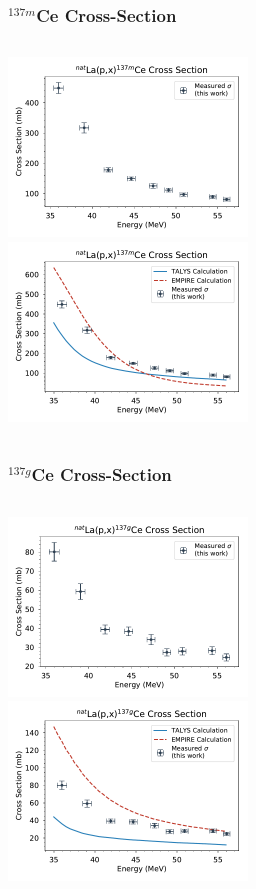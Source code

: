 \documentclass[12pt,xcolor=dvipsnames]{beamer}
\begin{document}
\begin{frame}
\frametitle{$^{137m}$Ce Cross-Section}
\begin{columns}[c]
\column{2.5in}
\includegraphics[width=2.5in]{cross_sections/137CEm_only}
\\
\column{2.5in}
\includegraphics[width=2.5in]{cross_sections/137CEm}
\\
\end{columns}
\end{frame}

\begin{frame}
\frametitle{$^{137g}$Ce Cross-Section}
\begin{columns}[c]
\column{2.5in}
\includegraphics[width=2.5in]{cross_sections/137CEg_only}
\\
\column{2.5in}
\includegraphics[width=2.5in]{cross_sections/137CEg}
\\
\end{columns}
\end{frame}
\end{document}
